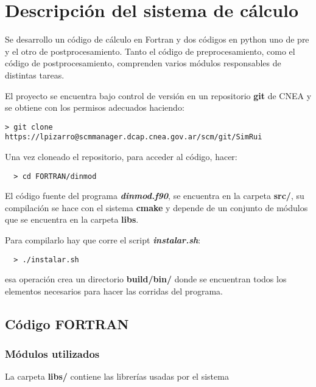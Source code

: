 

\section{Descripci\'on del sistema de c\'alculo}


Se desarrollo un c\'odigo de c\'alculo en Fortran y dos c\'odigos
en python uno  de pre y el otro de postprocesamiento. Tanto el código de 
preprocesamiento, 
como el código de postprocesamiento, comprenden varios módulos responsables de distintas
tareas.

El proyecto se encuentra bajo control de versión en un repositorio \textbf{git} de CNEA
y se obtiene con los permisos adecuados haciendo:

\begin{verbatim}
> git clone https://lpizarro@scmmanager.dcap.cnea.gov.ar/scm/git/SimRui
\end{verbatim}


Una vez cloneado el repositorio, para acceder al código, hacer:

\begin{verbatim}
  > cd FORTRAN/dinmod
\end{verbatim}



El c\'odigo fuente del programa \textbf{\textit{dinmod.f90}}, se encuentra en la carpeta
\textbf{src/}, su compilación se hace con el sistema \textbf{cmake} y depende
de un conjunto de módulos que se encuentra en la carpeta \textbf{libs}.

Para compilarlo hay que corre el script \textbf{\textit{instalar.sh}}:

\begin{verbatim}
  > ./instalar.sh 
\end{verbatim}

esa operación crea un directorio  \textbf{build/bin/} donde se encuentran todos
los elementos necesarios para hacer las corridas del programa.

\subsection{Código FORTRAN}


\subsubsection{Módulos  utilizados}

La carpeta \textbf{libs/} contiene las librer\'ias usadas por el sistema

